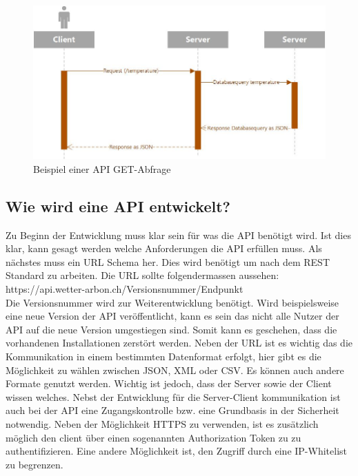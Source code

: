 \begin{figure}[h!]
	\centering
	\includegraphics[width=1\linewidth]{img/Sequenzdiagramm_API}
	\caption{Beispiel einer API GET-Abfrage}
	\label{img:Sequenzdiagramm_API}
\end{figure}


\subsection{Wie wird eine API entwickelt?}
Zu Beginn der Entwicklung muss klar sein für was die API benötigt wird. Ist dies klar, kann gesagt werden welche Anforderungen die API erfüllen muss. Als nächstes muss ein URL Schema her. Dies wird benötigt um nach dem REST Standard zu arbeiten. Die URL sollte folgendermassen aussehen: \\ https://api.wetter-arbon.ch/Versionsnummer/Endpunkt\\
Die Versionsnummer wird zur Weiterentwicklung benötigt. Wird beispielsweise eine neue Version der API veröffentlicht, kann es sein das nicht alle Nutzer der API auf die neue Version umgestiegen sind. Somit kann es geschehen, dass die vorhandenen Installationen zerstört werden. Neben der URL ist es wichtig das die Kommunikation in einem bestimmten Datenformat erfolgt, hier gibt es die Möglichkeit zu wählen zwischen JSON, XML oder CSV. Es können auch andere Formate genutzt werden. Wichtig ist jedoch, dass der Server sowie der Client wissen welches. Nebst der Entwicklung für die Server-Client kommunikation ist auch bei der API eine Zugangskontrolle bzw. eine Grundbasis in der Sicherheit notwendig. Neben der Möglichkeit HTTPS zu verwenden, ist es zusätzlich möglich den client über einen sogenannten Authorization Token zu zu authentifizieren. Eine andere Möglichkeit ist, den Zugriff durch eine IP-Whitelist zu begrenzen. \\


